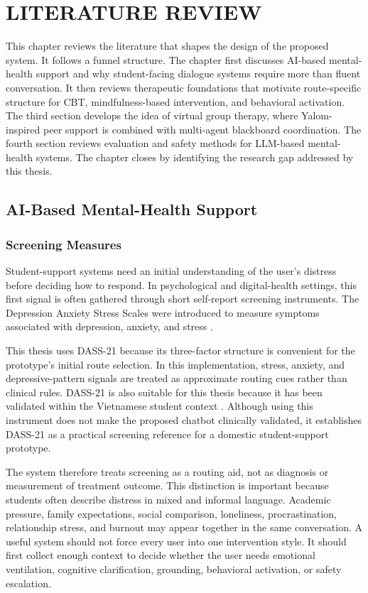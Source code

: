 \chapter{LITERATURE REVIEW}

This chapter reviews the literature that shapes the design of the proposed system. It follows a funnel structure. The chapter first discusses AI-based mental-health support and why student-facing dialogue systems require more than fluent conversation. It then reviews therapeutic foundations that motivate route-specific structure for CBT, mindfulness-based intervention, and behavioral activation. The third section develops the idea of virtual group therapy, where Yalom-inspired peer support is combined with multi-agent blackboard coordination. The fourth section reviews evaluation and safety methods for LLM-based mental-health systems. The chapter closes by identifying the research gap addressed by this thesis.

\section{AI-Based Mental-Health Support}

\subsection{Screening Measures}

Student-support systems need an initial understanding of the user's distress before deciding how to respond. In psychological and digital-health settings, this first signal is often gathered through short self-report screening instruments. The Depression Anxiety Stress Scales were introduced to measure symptoms associated with depression, anxiety, and stress \citep{Lovibond1995DASS}.

This thesis uses DASS-21 because its three-factor structure is convenient for the prototype's initial route selection. In this implementation, stress, anxiety, and depressive-pattern signals are treated as approximate routing cues rather than clinical rules. DASS-21 is also suitable for this thesis because it has been validated within the Vietnamese student context \citep{Le2017DASS21Vietnamese}. Although using this instrument does not make the proposed chatbot clinically validated, it establishes DASS-21 as a practical screening reference for a domestic student-support prototype.

The system therefore treats screening as a routing aid, not as diagnosis or measurement of treatment outcome. This distinction is important because students often describe distress in mixed and informal language. Academic pressure, family expectations, social comparison, loneliness, procrastination, relationship stress, and burnout may appear together in the same conversation. A useful system should not force every user into one intervention style. It should first collect enough context to decide whether the user needs emotional ventilation, cognitive clarification, grounding, behavioral activation, or safety escalation.


